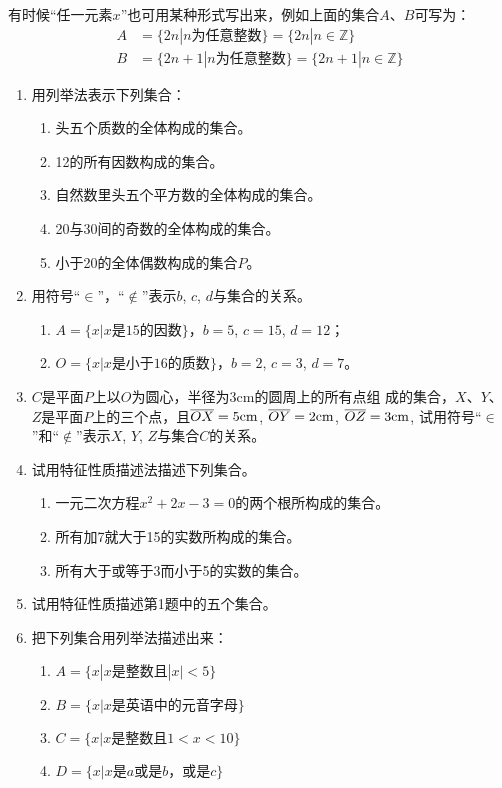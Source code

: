 有时候“任一元素$x$”也可用某种形式写出来，例如上面的集合$A$、$B$可写为：
\[\begin{split}
    A&=\{2n|n\text{为任意整数}\}=\{2n|n\in\mathbb{Z}\}\\
    B&=\{2n+1|n\text{为任意整数}\}=\{2n+1|n\in\mathbb{Z}\}
\end{split}\]

\begin{ex}
\begin{enumerate}
    \item 用列举法表示下列集合：
\begin{enumerate}
    \item 头五个质数的全体构成的集合。
    \item 12的所有因数构成的集合。
    \item 自然数里头五个平方数的全体构成的集合。
    \item 20与30间的奇数的全体构成的集合。
    \item 小于20的全体偶数构成的集合$P$。
\end{enumerate}

\item 用符号“$\in$”，“$\notin$”表示$b$, $c$, $d$与集合的关系。
\begin{enumerate}
    \item $A=\{x|x\text{是15的因数}\}$，$b=5$, $c=15$, $d=12$；
    \item $O=\{x|x\text{是小于16的质数}\}$，$b=2$, $c=3$, $d=7$。
\end{enumerate}

\item $C$是平面$P$上以$O$为圆心，半径为3cm的圆周上的所有点组
成的集合，$X$、$Y$、$Z$是平面$P$上的三个点，且$\overline{OX}=5{\rm cm}$, $\overline{OY}=2{\rm  cm}$, $\overline{OZ}=3{\rm cm}$, 试用符号“$\in$”和“$\notin$”表示$X$,
$Y$, $Z$与集合$C$的关系。

\item 试用特征性质描述法描述下列集合。
\begin{enumerate}
    \item 一元二次方程$x^2+2x-3=0$的两个根所构成的集合。
    \item 所有加7就大于15的实数所构成的集合。
    \item 所有大于或等于3而小于5的实数的集合。
\end{enumerate}

\item 试用特征性质描述第1题中的五个集合。

\item 把下列集合用列举法描述出来：
\begin{enumerate}
    \item $A=\{x|x\text{是整数且}|x|<5\}$
    \item $B=\{x|x\text{是英语中的元音字母}\}$
    \item $C=\{x|x\text{是整数且}1<x<10  \}$
    \item $D=\{x|x\text{是$a$或是$b$，或是$c$}\}$
\end{enumerate}
\end{enumerate} 
\end{ex}

